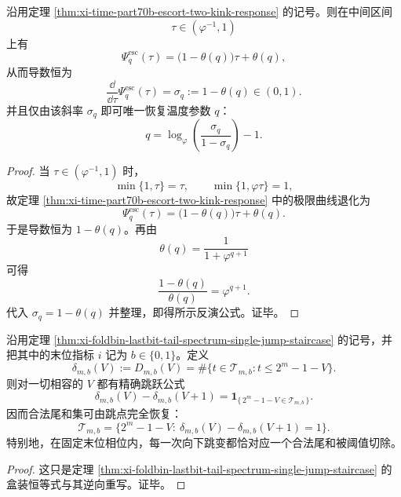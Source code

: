 \begin{corollary}[中心双折点骨架上的温度斜率可辨识性]\label{cor:xi-time-part70b-escort-slope-identifiability}
沿用定理 \ref{thm:xi-time-part70b-escort-two-kink-response} 的记号。则在中间区间
\[
\tau\in (\varphi^{-1},1)
\]
上有
\[
\Psi_q^{\mathrm{esc}}(\tau)
=
\bigl(1-\theta(q)\bigr)\tau+\theta(q),
\]
从而导数恒为
\[
\frac{\dd}{\dd\tau}\Psi_q^{\mathrm{esc}}(\tau)
=
\sigma_q
:=
1-\theta(q)\in(0,1).
\]
并且仅由该斜率 \(\sigma_q\) 即可唯一恢复温度参数 \(q\)：
\[
q=\log_{\varphi}\!\left(\frac{\sigma_q}{1-\sigma_q}\right)-1.
\]
\end{corollary}
\begin{proof}
当 \(\tau\in(\varphi^{-1},1)\) 时，
\[
\min\{1,\tau\}=\tau,
\qquad
\min\{1,\varphi\tau\}=1,
\]
故定理 \ref{thm:xi-time-part70b-escort-two-kink-response} 中的极限曲线退化为
\[
\Psi_q^{\mathrm{esc}}(\tau)
=
\bigl(1-\theta(q)\bigr)\tau+\theta(q).
\]
于是导数恒为 \(1-\theta(q)\)。再由
\[
\theta(q)=\frac{1}{1+\varphi^{q+1}}
\]
可得
\[
\frac{1-\theta(q)}{\theta(q)}=\varphi^{q+1}.
\]
代入 \(\sigma_q=1-\theta(q)\) 并整理，即得所示反演公式。证毕。
\end{proof}

\begin{corollary}[固定末位层的阈值层纹由单跳尾和谱完全恢复]\label{cor:xi-time-part70b-lastbit-tail-jump-recovery}
沿用定理 \ref{thm:xi-foldbin-lastbit-tail-spectrum-single-jump-staircase} 的记号，并把其中的末位指标 \(i\) 记为 \(b\in\{0,1\}\)。定义
\[
\delta_{m,b}(V):=
D_{m,b}(V)
=
\#\bigl\{t\in \mathcal T_{m,b}: t\le 2^m-1-V\bigr\}.
\]
则对一切相容的 \(V\) 都有精确跳跃公式
\[
\delta_{m,b}(V)-\delta_{m,b}(V+1)
=
\mathbf 1_{\{\,2^m-1-V\in\mathcal T_{m,b}\,\}}.
\]
因而合法尾和集可由跳点完全恢复：
\[
\mathcal T_{m,b}
=
\bigl\{2^m-1-V:\ \delta_{m,b}(V)-\delta_{m,b}(V+1)=1\bigr\}.
\]
特别地，在固定末位相位内，每一次向下跳变都恰对应一个合法尾和被阈值切除。
\end{corollary}
\begin{proof}
这只是定理 \ref{thm:xi-foldbin-lastbit-tail-spectrum-single-jump-staircase} 的盒装恒等式与其逆向重写。证毕。
\end{proof}

